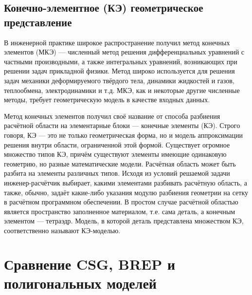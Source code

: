 \subsection{Конечно-элементное (КЭ) геометрическое представление}\label{sec:secGeoFEM}

В инженерной практике широкое распространение получил метод конечных элементов (МКЭ) --- численный метод решения дифференциальных уравнений с частными производными, а также интегральных уравнений, возникающих при решении задач прикладной физики. Метод широко используется для решения задач механики деформируемого твёрдого тела, динамики жидкостей и газов, теплообмена, электродинамики и т.д. МКЭ, как и некоторые другие численные методы, требует геометрическую модель в качестве входных данных.

Метод конечных элементов получил своё название от способа разбиения расчётной области на элементарные блоки --- конечные элементы (КЭ). Строго говоря, КЭ --- это не только геометрическая форма, но и модель аппроксимации решения внутри области, ограниченной этой формой. Существует огромное множество типов КЭ, причём существуют элементы имеющие одинаковую геометрию, но разные математические модели. Расчётная область может быть разбита на элементы различных типов. Исходя из условий решаемой задачи инженер-расчётчик выбирает, какими элементами разбивать расчётную область, а также, обычно, задаёт какие-либо указания модулю разбиения геометрии на сетку в расчётном программном обеспечении. В простом случае расчётной областью является пространство заполненное материалом, т.е. сама деталь, а конечным элементом --- тетраэдр. Модель, в которой деталь представлена множеством КЭ, соответственно называют КЭ-моделью.


\section{Сравнение CSG, BREP и полигональных моделей}

